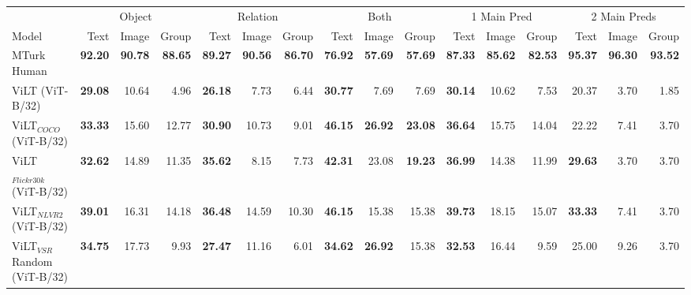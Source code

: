 \begin{table}[ht]
    \centering
    \begin{adjustbox}{max width=\textwidth}
  \begin{tabular}{l|rrr|rrr|rrr|rrr|rrr}
    \toprule
     &
      \multicolumn{3}{c|}{Object} &
      \multicolumn{3}{c|}{Relation} &
      \multicolumn{3}{c|}{Both} &
      \multicolumn{3}{c|}{1 Main Pred} &
      \multicolumn{3}{c}{2 Main Preds}\\
    Model & Text & Image & Group & Text & Image & Group & Text & Image & Group & Text & Image & Group & Text & Image & Group \\\midrule
 MTurk Human                  & \textbf{92.20} & \textbf{90.78} & \textbf{88.65} & \textbf{89.27} & \textbf{90.56} & \textbf{86.70} & \textbf{76.92} & \textbf{57.69} & \textbf{57.69} & \textbf{87.33} & \textbf{85.62} & \textbf{82.53} & \textbf{95.37} & \textbf{96.30} & \textbf{93.52} \\
 ViLT (ViT-B/32)                     & \textbf{29.08} & 10.64          & 4.96           & \textbf{26.18} & 7.73           & 6.44           & \textbf{30.77} & 7.69           & 7.69           & \textbf{30.14} & 10.62          & 7.53           & 20.37          & 3.70           & 1.85           \\
 ViLT$_{COCO}$ (ViT-B/32)            & \textbf{33.33} & 15.60          & 12.77          & \textbf{30.90} & 10.73          & 9.01           & \textbf{46.15} & \textbf{26.92} & \textbf{23.08} & \textbf{36.64} & 15.75          & 14.04          & 22.22          & 7.41           & 3.70           \\
 ViLT$_{Flickr30k}$ (ViT-B/32)       & \textbf{32.62} & 14.89          & 11.35          & \textbf{35.62} & 8.15           & 7.73           & \textbf{42.31} & 23.08          & \textbf{19.23} & \textbf{36.99} & 14.38          & 11.99          & \textbf{29.63} & 3.70           & 3.70           \\
 ViLT$_{NLVR2}$ (ViT-B/32)           & \textbf{39.01} & 16.31          & 14.18          & \textbf{36.48} & 14.59          & 10.30          & \textbf{46.15} & 15.38          & 15.38          & \textbf{39.73} & 18.15          & 15.07          & \textbf{33.33} & 7.41           & 3.70           \\
 ViLT$_{VSR}$ Random (ViT-B/32)      & \textbf{34.75} & 17.73          & 9.93           & \textbf{27.47} & 11.16          & 6.01           & \textbf{34.62} & \textbf{26.92} & 15.38          & \textbf{32.53} & 16.44          & 9.59           & 25.00          & 9.26           & 3.70           \\

\end{tabular}
\end{adjustbox}
\end{table}
